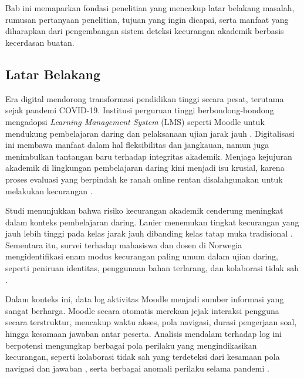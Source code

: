 \chapter{\babSatu}
\label{bab:1}
Bab ini memaparkan fondasi penelitian yang mencakup latar belakang masalah, rumusan pertanyaan penelitian, tujuan yang ingin dicapai, serta manfaat yang diharapkan dari pengembangan sistem deteksi kecurangan akademik berbasis kecerdasan buatan. 

\section{Latar Belakang}
\label{sec:latarBelakang}

Era digital mendorong transformasi pendidikan tinggi secara pesat, terutama sejak pandemi COVID-19. Institusi perguruan tinggi berbondong-bondong mengadopsi \textit{Learning Management System} (LMS) seperti Moodle untuk mendukung pembelajaran daring dan pelaksanaan ujian jarak jauh \cite{Yulita2023}. Digitalisasi ini membawa manfaat dalam hal fleksibilitas dan jangkauan, namun juga menimbulkan tantangan baru terhadap integritas akademik. Menjaga kejujuran akademik di lingkungan pembelajaran daring kini menjadi isu krusial, karena proses evaluasi yang berpindah ke ranah online rentan disalahgunakan untuk melakukan kecurangan \cite{Kamalov2021}.

Studi menunjukkan bahwa risiko kecurangan akademik cenderung meningkat dalam konteks pembelajaran daring. Lanier menemukan tingkat kecurangan yang jauh lebih tinggi pada kelas jarak jauh dibanding kelas tatap muka tradisional \cite{Lanier2006}. Sementara itu, survei terhadap mahasiswa dan dosen di Norwegia mengidentifikasi enam modus kecurangan paling umum dalam ujian daring, seperti peniruan identitas, penggunaan bahan terlarang, dan kolaborasi tidak sah \cite{Chirumamilla2020}.

Dalam konteks ini, data log aktivitas Moodle menjadi sumber informasi yang sangat berharga. Moodle secara otomatis merekam jejak interaksi pengguna secara terstruktur, mencakup waktu akses, pola navigasi, durasi pengerjaan soal, hingga kesamaan jawaban antar peserta. Analisis mendalam terhadap log ini berpotensi mengungkap berbagai pola perilaku yang mengindikasikan kecurangan, seperti kolaborasi tidak sah yang terdeteksi dari kesamaan pola navigasi dan jawaban \cite{Murdoch2019}, serta berbagai anomali perilaku selama pandemi \cite{Balderas2020}.

